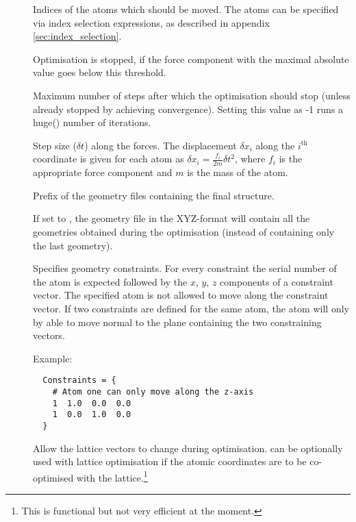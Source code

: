 \begin{description}
\item[] Indices of the atoms which should be moved. The
  atoms can be specified via index selection expressions, as described
  in appendix \ref{sec:index_selection}.

\item[] Optimisation is
  stopped, if the force component with the maximal absolute value goes
  below this threshold.

\item[] Maximum number of steps after which the optimisation should
  stop (unless already stopped by achieving convergence). Setting this value as
  -1 runs a huge() number of iterations.

\item[] Step size ($\delta t$)
  along the forces. The displacement $\delta x_i$ along the
  $i^\mathrm{th}$ coordinate is given for each atom as $\delta x_i =
  \frac{f_i}{2m}\delta t^2$, where $f_i$ is the appropriate force
  component and $m$ is the mass of the atom.

\item[] Prefix of the geometry files containing the
  final structure.

\item[] If set to , the geometry file in
  the XYZ-format will contain all the geometries obtained during the
  optimisation (instead of containing only the last geometry).

\item[] Specifies geometry constraints. For every
  constraint the serial number of the atom is expected followed by the
  $x$, $y$, $z$ components of a constraint vector. The specified atom
  is not allowed to move along the constraint vector. If two
  constraints are defined for the same atom, the atom will only by
  able to move normal to the plane containing the two constraining
  vectors.

  Example:
  \invparskip
\begin{verbatim}
  Constraints = {
    # Atom one can only move along the z-axis
    1  1.0  0.0  0.0
    1  0.0  1.0  0.0
  }
\end{verbatim}

\item[] Allow the lattice vectors to change during
  optimisation.  can be optionally used with lattice
  optimisation if the atomic coordinates are to be co-optimised with
  the lattice.\footnote{This is functional but not very efficient at
    the moment.}


\end{description}
